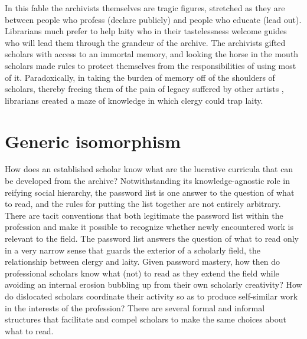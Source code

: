 \documentclass[]{book}
\theoremstyle{definition}
\theoremstyle{definition}
\theoremstyle{definition}
\theoremstyle{remark}
\begin{document}
In this fable the archivists themselves are tragic figures, stretched as
they are between people who profess (declare publicly) and people who
educate (lead out). Librarians much prefer to help laity who in their
tastelessness welcome guides who will lead them through the grandeur of
the archive. The archivists gifted scholars with access to an immortal
memory, and looking the horse in the mouth scholars made rules to
protect themselves from the responsibilities of using most of it.
Paradoxically, in taking the burden of memory off of the shoulders of
scholars, thereby freeing them of the pain of legacy suffered by other
artists \citep{Lang1988Recognition}, librarians created a maze of
knowledge in which clergy could trap laity.

\hypertarget{generic-isomorphism}{%
\section{Generic isomorphism}\label{generic-isomorphism}}

How does an established scholar know what are the lucrative curricula
that can be developed from the archive? Notwithstanding its
knowledge-agnostic role in reifying social hierarchy, the password list
is one answer to the question of what to read, and the rules for putting
the list together are not entirely arbitrary. There are tacit
conventions that both legitimate the password list within the profession
and make it possible to recognize whether newly encountered work is
relevant to the field. The password list answers the question of what to
read only in a very narrow sense that guards the exterior of a scholarly
field, the relationship between clergy and laity. Given password
mastery, how then do professional scholars know what (not) to read as
they extend the field while avoiding an internal erosion bubbling up
from their own scholarly creativity? How do dislocated scholars
coordinate their activity so as to produce self-similar work in the
interests of the profession? There are several formal and informal
structures that facilitate and compel scholars to make the same choices
about what to read.
\end{document}
